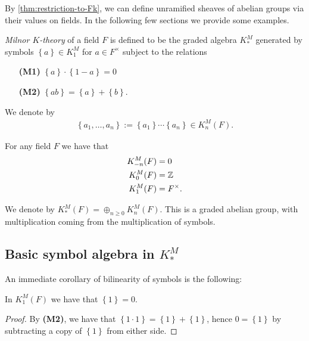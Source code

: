 \documentclass[11pt,openany]{book}
\begin{document}
By \autoref{thm:restriction-to-Fk}, we can define unramified sheaves of abelian groups via their values on fields. In the following few sections we provide some examples.

\begin{definition} \textit{Milnor $K$-theory} of a field $F$ is defined to be the graded algebra $K_\ast^M$ generated by symbols $\left\{ a \right\}\in K_1^M$ for $a\in F^\times$ subject to the relations
\begin{enumerate}
    \item[\textbf{(M1)}] $\left\{ a \right\}\cdot \left\{ 1-a \right\} = 0$
    \item[\textbf{(M2)}] $\left\{ ab \right\} = \left\{ a \right\} + \left\{ b \right\}$.
\end{enumerate}
\end{definition}

\begin{notation} We denote by
\begin{align*}
    \left\{ a_1, \ldots, a_n \right\} := \left\{ a_1 \right\} \cdots \left\{ a_n \right\}\in K_n^M(F).
\end{align*}
\end{notation}

\begin{proposition} For any field $F$ we have that
\begin{align*}
    K^M_{-n}(F) &= 0 \\
    K^M_0(F) &= \mathbb{Z} \\
    K^M_{1}(F) &= F^\times.
\end{align*}
\end{proposition}

\begin{notation} We denote by $K_\ast^M(F) = \oplus_{n\ge0} K_n^M(F)$. This is a graded abelian group, with multiplication coming from the multiplication of symbols.
\end{notation}


\subsection{Basic symbol algebra in $K_\ast^M$}



An immediate corollary of bilinearity of symbols is the following:

\begin{proposition} In $K_1^M(F)$ we have that $\left\{ 1 \right\} = 0$.
\end{proposition}
\begin{proof} By \textbf{(M2)}, we have that $\left\{ 1\cdot 1 \right\} = \left\{ 1 \right\} + \left\{ 1 \right\}$, hence $0 = \left\{ 1 \right\}$ by subtracting a copy of $\left\{ 1 \right\}$ from either side.
\end{proof}
\end{document}
